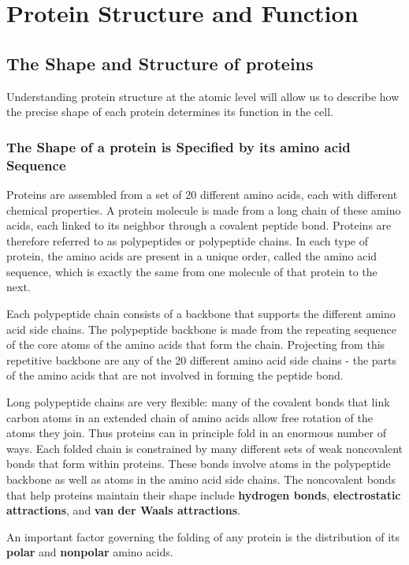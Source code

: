 \chapter{Protein Structure and Function}

\section{The Shape and Structure of proteins}

Understanding protein
structure at the atomic level will allow us to describe how the precise
shape of each protein determines its function in the cell.

\subsection{The Shape of a protein is Specified by its amino acid Sequence}

Proteins are assembled from a set of 20 different amino acids, each with different chemical properties. A protein
molecule is made from a long chain of these amino acids, each linked
to its neighbor through a covalent peptide bond. Proteins
are therefore referred to as polypeptides or polypeptide chains. In each
type of protein, the amino acids are present in a unique order, called the
amino acid sequence, which is exactly the same from one molecule
of that protein to the next.

Each polypeptide chain consists of a backbone that supports the different
amino acid side chains. The polypeptide backbone is made from
the repeating sequence of the core atoms of the amino acids that form
the chain. Projecting from this repetitive backbone are any of the 20 different
amino acid side chains - the parts of the amino acids that are not
involved in forming the peptide bond.

Long polypeptide chains are very flexible: many of the covalent bonds
that link carbon atoms in an extended chain of amino acids allow free
rotation of the atoms they join. Thus proteins can in principle fold in an
enormous number of ways. Each folded chain is constrained by many different
sets of weak noncovalent bonds that form within proteins. These
bonds involve atoms in the polypeptide backbone as well as atoms in
the amino acid side chains. The noncovalent bonds that help proteins
maintain their shape include \textbf{hydrogen bonds}, \textbf{electrostatic attractions},
and \textbf{van der Waals attractions}.

An important factor governing the folding of any protein is the distribution
of its \textbf{polar} and \textbf{nonpolar} amino acids.


